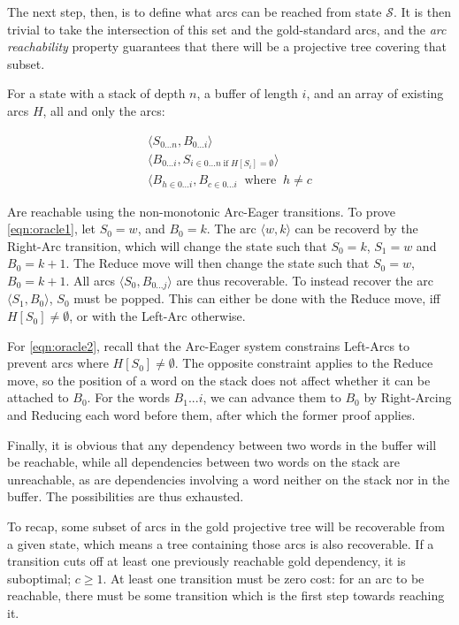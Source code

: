 \documentclass[11pt,letterpaper]{article}
\newcommand{\state}{\mathcal{S}}
\begin{document}
The next step, then, is to define what arcs can be reached from state $\state$.
It is then trivial to take the intersection of this set and the gold-standard
arcs, and the \emph{arc reachability} property guarantees that there will be a
projective tree covering that subset.

For a state with a stack of depth $n$, a buffer of length $i$, and an array of
existing arcs $H$, all and only the arcs:

\begin{eqnarray}
    \langle S_{0...n}, B_{0...i}\rangle \label{eqn:oracle1} \\
    \langle B_{0...i}, S_{i \in {0...n}\;\mbox{if}\; H[S_i] = \emptyset } \rangle \label{eqn:oracle2}\\
    \langle B_{h \in {0...i}}, B_{c \in {0...i}}\;\; \mbox{where}\;\; h \neq c
\end{eqnarray}

Are reachable using the non-monotonic Arc-Eager transitions.
To prove \ref{eqn:oracle1}, let $S_0=w$, and $B_0=k$. The
arc $\langle w, k\rangle$ can be recoverd by the Right-Arc transition, which
will change the state such that $S_0=k$, $S_1=w$ and $B_0=k+1$. The Reduce
move will then change the state such that $S_0=w$, $B_0=k+1$. All arcs
$\langle S_0, B_{0...j}\rangle$ are thus recoverable. To instead recover the arc
$\langle S_1, B_{0}\rangle$, $S_0$ must be popped. This can either be done
with the Reduce move, iff $H[S_0] \neq \emptyset$, or with the Left-Arc otherwise.

For \ref{eqn:oracle2}, recall that the Arc-Eager system constrains
Left-Arcs to prevent arcs where $H[S_0] \neq \emptyset$. The opposite constraint
applies to the Reduce move, so the position of a word on the stack does not
affect whether it can be attached to $B_0$. For the words $B_1...i$, we can
advance them to $B_0$ by Right-Arcing and Reducing each word before them,
after which the former proof applies.

Finally, it is obvious that any dependency between two words in the buffer will
be reachable, while all dependencies between two words on the stack are unreachable,
as are dependencies involving a word neither on the stack nor in the buffer. The
possibilities are thus exhausted.

To recap, some subset of arcs in the gold projective tree will be recoverable
from a given state, which means a tree containing those arcs is also recoverable.
If a transition cuts off at least one previously reachable gold dependency, it is
suboptimal; $c \ge 1$.
At least one transition must be zero cost: for an arc to be reachable, there
must be some transition which is the first step towards reaching it.
\end{document}

